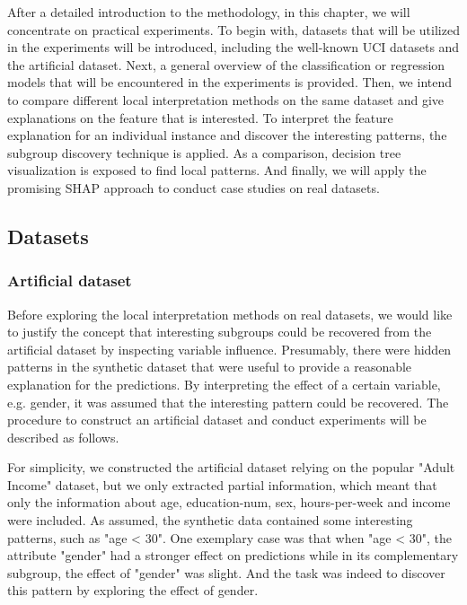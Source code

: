 After a detailed introduction to the methodology, in this chapter, we will concentrate on practical experiments. To begin with, datasets that will be utilized in the experiments will be introduced, including the well-known UCI datasets and the artificial dataset. Next, a general overview of the classification or regression models that will be encountered in the experiments is provided. Then, we intend to compare different local interpretation methods on the same dataset and give explanations on the feature that is interested. To interpret the feature explanation for an individual instance and discover the interesting patterns, the subgroup discovery technique is applied. As a comparison, decision tree visualization is exposed to find local patterns. And finally, we will apply the promising SHAP approach to conduct case studies on real datasets. 

\subsection{Datasets}


\subsubsection{Artificial dataset}

Before exploring the local interpretation methods on real datasets, we would like to justify the concept that interesting subgroups could be recovered from the artificial dataset by inspecting variable influence. Presumably, there were hidden patterns in the synthetic dataset that were useful to provide a reasonable explanation for the predictions. By interpreting the effect of a certain variable, e.g. gender, it was assumed that the interesting pattern could be recovered. The procedure to construct an artificial dataset and conduct experiments will be described as follows. 

For simplicity, we constructed the artificial dataset relying on the popular "Adult Income" dataset, but we only extracted partial information, which meant that only the information about age, education-num, sex, hours-per-week and income were included. As assumed, the synthetic data contained some interesting patterns, such as "age < 30". One exemplary case was that when "age < 30", the attribute "gender" had a stronger effect on predictions while in its complementary subgroup, the effect of "gender" was slight. And the task was indeed to discover this pattern by exploring the effect of gender. 

